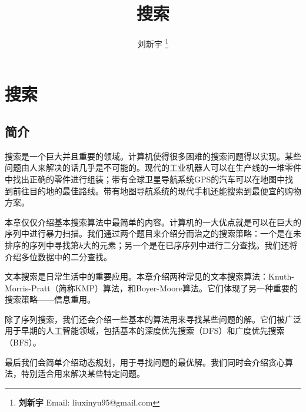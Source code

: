 \documentclass[UTF8]{article}
\begin{document}


\title{搜索}

\author{刘新宇
\thanks{{\bfseries 刘新宇 } \newline
  Email: liuxinyu95@gmail.com \newline}
  }

\maketitle
\fi


\ifx\wholebook\relax
\chapter{搜索}
\fi

\section{简介}
\label{introduction}

搜索是一个巨大并且重要的领域。计算机使得很多困难的搜索问题得以实现。某些问题由人来解决的话几乎是不可能的。现代的工业机器人可以在生产线的一堆零件中找出正确的零件进行组装；带有全球卫星导航系统GPS的汽车可以在地图中找到前往目的地的最佳路线。带有地图导航系统的现代手机还能搜索到最便宜的购物方案。

本章仅仅介绍基本搜索算法中最简单的内容。计算机的一大优点就是可以在巨大的序列中进行暴力扫描。我们通过两个题目来介绍分而治之的搜索策略：一个是在未排序的序列中寻找第$k$大的元素；另一个是在已序序列中进行二分查找。我们还将介绍多位数据中的二分查找。

文本搜索是日常生活中的重要应用。本章介绍两种常见的文本搜索算法：Knuth-Morris-Pratt（简称KMP）算法，和Boyer-Moore算法。它们体现了另一种重要的搜索策略——信息重用。

除了序列搜索，我们还会介绍一些基本的算法用来寻找某些问题的解。它们被广泛用于早期的人工智能领域，包括基本的深度优先搜索（DFS）和广度优先搜索（BFS）。

最后我们会简单介绍动态规划，用于寻找问题的最优解。我们同时会介绍贪心算法，特别适合用来解决某些特定问题。
\end{document}
